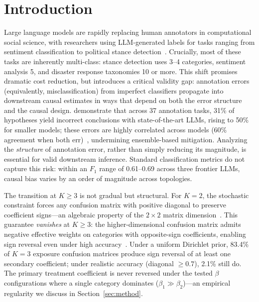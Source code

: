 \section{Introduction}
\label{sec:introduction}

Large language models are rapidly replacing human annotators in computational social science, with researchers using LLM-generated labels for tasks ranging from sentiment classification to political stance detection~\cite{gilardi2023chatgpt, ziems2024can, egami_hinck_stewart_wei2023, baumann2025}. Crucially, most of these tasks are inherently multi-class: stance detection uses 3--4 categories, sentiment analysis 5, and disaster response taxonomies 10 or more. This shift promises dramatic cost reduction, but introduces a critical validity gap: annotation errors (equivalently, misclassification) from imperfect classifiers propagate into downstream causal estimates in ways that depend on both the error structure and the causal design. \citet{baumann2025} demonstrate that across 37 annotation tasks, 31\% of hypotheses yield incorrect conclusions with state-of-the-art LLMs, rising to 50\% for smaller models; these errors are highly correlated across models (60\% agreement when both err)~\cite{kim_garg2025}, undermining ensemble-based mitigation. Analyzing the \emph{structure} of annotation error, rather than simply reducing its magnitude, is essential for valid downstream inference. Standard classification metrics do not capture this risk: within an $F_1$ range of 0.61--0.69 across three frontier LLMs, causal bias varies by an order of magnitude across topologies.

The transition at $K{\geq}3$ is not gradual but structural. For $K{=}2$, the stochastic constraint forces any confusion matrix with positive diagonal to preserve coefficient signs---an algebraic property of the $2{\times}2$ matrix dimension~\cite{brenner1993}. This guarantee \emph{vanishes} at $K{\geq}3$: the higher-dimensional confusion matrix admits negative effective weights on categories with opposite-sign coefficients, enabling sign reversal even under high accuracy~\cite{veirod_laake2001}. Under a uniform Dirichlet prior, 83.4\% of $K{=}3$ exposure confusion matrices produce sign reversal of at least one secondary coefficient; under realistic accuracy (diagonal $\geq 0.7$), 2.1\% still do. The primary treatment coefficient is never reversed under the tested $\beta$ configurations where a single category dominates ($\beta_1 \gg \beta_2$)---an empirical regularity we discuss in Section~\ref{sec:method}.

